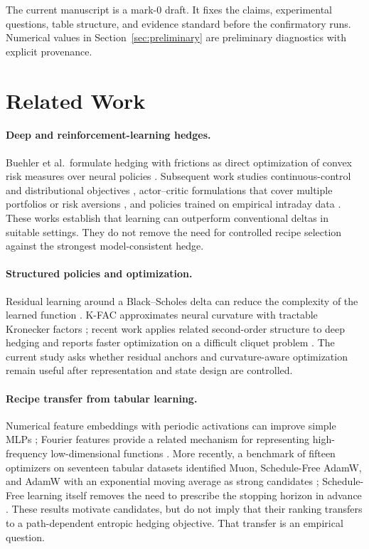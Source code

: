 \documentclass[sigconf,balance=false]{acmart}
\begin{document}
The current manuscript is a mark-0 draft.  It fixes the claims, experimental
questions, table structure, and evidence standard before the confirmatory runs.
Numerical values in Section~\ref{sec:preliminary} are preliminary diagnostics
with explicit provenance.

\section{Related Work}

\paragraph{Deep and reinforcement-learning hedges.}
Buehler et al.\ formulate hedging with frictions as direct optimization of
convex risk measures over neural policies \cite{buehler2019deep}.  Subsequent
work studies continuous-control and distributional objectives
\cite{cao2021deep}, actor--critic formulations that cover multiple portfolios
or risk aversions \cite{murray2022continuous,buehler2024bellman}, and policies
trained on empirical intraday data \cite{mikkila2023empirical}.  These works
establish that learning can outperform conventional deltas in suitable
settings.  They do not remove the need for controlled recipe selection against
the strongest model-consistent hedge.

\paragraph{Structured policies and optimization.}
Residual learning around a Black--Scholes delta can reduce the complexity of
the learned function \cite{qiao2024enhancing}.  K-FAC approximates neural
curvature with tractable Kronecker factors \cite{martens2015kfac}; recent work
applies related second-order structure to deep hedging and reports faster
optimization on a difficult cliquet problem \cite{mueller2024fast}.  The
current study asks whether residual anchors and curvature-aware optimization
remain useful after representation and state design are controlled.

\paragraph{Recipe transfer from tabular learning.}
Numerical feature embeddings with periodic activations can improve simple MLPs
\cite{gorishniy2022embeddings}; Fourier features provide a related mechanism
for representing high-frequency low-dimensional functions
\cite{tancik2020fourier}.  More recently, a benchmark of fifteen optimizers on
seventeen tabular datasets identified Muon, Schedule-Free AdamW, and AdamW with
an exponential moving average as strong candidates
\cite{gorishniy2026optimizers}; Schedule-Free learning itself removes the need
to prescribe the stopping horizon in advance \cite{defazio2024schedulefree}.
These results motivate candidates, but do not imply that their ranking transfers
to a path-dependent entropic hedging objective.  That transfer is an empirical
question.
\end{document}
